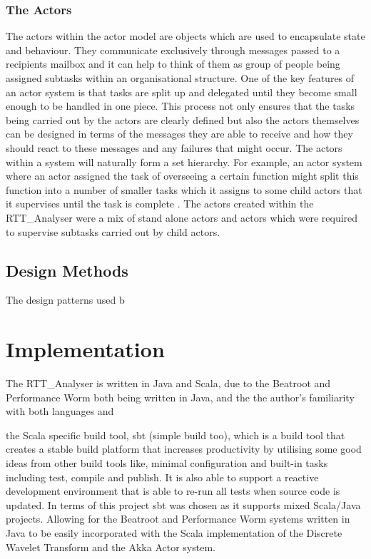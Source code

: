 \documentclass[a4paper, 11pt]{article}
\begin{document}
\subsubsection{The Actors}
The actors within the actor model are objects which are used to encapsulate state and behaviour. They communicate exclusively through messages passed to a recipients mailbox and it can help to think of them as group of people being assigned subtasks within an organisational structure. One of the key features of an actor system is that tasks are split up and delegated until they become small enough to be handled in one piece. This process not only ensures that the tasks being carried out by the actors are clearly defined but also the actors themselves can be designed in terms of the messages they are able to receive and how they should react to these messages and any failures that might occur. The actors within a system will naturally form a set hierarchy. For example, an actor system where an actor assigned the task of overseeing a certain function might split this function into a number of smaller tasks which it assigns to some child actors that it supervises until the task is complete \cite{acotrsys}. The actors created within the RTT\_Analyser were a mix of stand alone actors and actors which were required to supervise subtasks carried out by child actors.

\subsection{Design Methods}
The design patterns used b     

\maketitle{} \section{Implementation}
The RTT\_Analyser is written in Java and Scala, due to the Beatroot and Performance Worm both being written in Java, and the the author's familiarity with both languages and 

the Scala specific build tool, sbt (simple build too), which is a build tool that creates a stable build platform that increases productivity by utilising some good ideas from other build tools like, minimal configuration and built-in tasks including test, compile and publish. It is also able to support a reactive development environment that is able to re-run all tests when source code is updated\cite{sbt}. In terms of this project sbt was chosen as it supports mixed Scala/Java projects. Allowing for the Beatroot and Performance Worm systems written in Java to be easily incorporated with the Scala implementation of the Discrete Wavelet Transform and the Akka Actor system.
\end{document}
